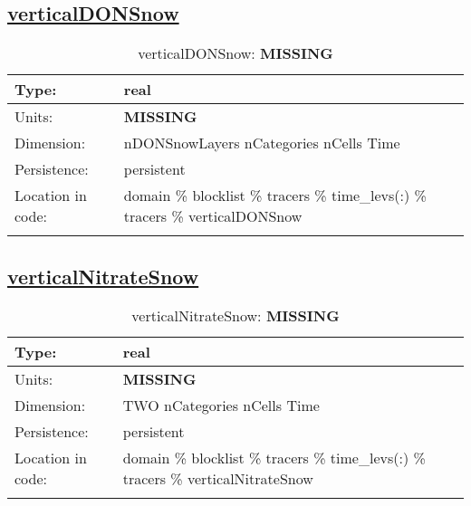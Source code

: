 \subsection[verticalDONSnow]{\hyperref[sec:var_tab_tracers]{verticalDONSnow}}
\label{subsec:var_sec_tracers_verticalDONSnow}
\begin{center}
\begin{longtable}{| p{2.0in} | p{4.0in} |}
        \hline 
        Type: & real \\
        \hline 
        Units: & {\bf \color{red} MISSING} \\
        \hline 
        Dimension: & nDONSnowLayers nCategories nCells Time \\
        \hline 
        Persistence: & persistent \\
        \hline 
         Location in code: & domain \% blocklist \% tracers \% time\_levs(:) \% tracers \% verticalDONSnow \\
         \hline 
    \caption{verticalDONSnow: {\bf \color{red} MISSING}}
\end{longtable}
\end{center}
\subsection[verticalNitrateSnow]{\hyperref[sec:var_tab_tracers]{verticalNitrateSnow}}
\label{subsec:var_sec_tracers_verticalNitrateSnow}
\begin{center}
\begin{longtable}{| p{2.0in} | p{4.0in} |}
        \hline 
        Type: & real \\
        \hline 
        Units: & {\bf \color{red} MISSING} \\
        \hline 
        Dimension: & TWO nCategories nCells Time \\
        \hline 
        Persistence: & persistent \\
        \hline 
         Location in code: & domain \% blocklist \% tracers \% time\_levs(:) \% tracers \% verticalNitrateSnow \\
         \hline 
    \caption{verticalNitrateSnow: {\bf \color{red} MISSING}}
\end{longtable}
\end{center}
